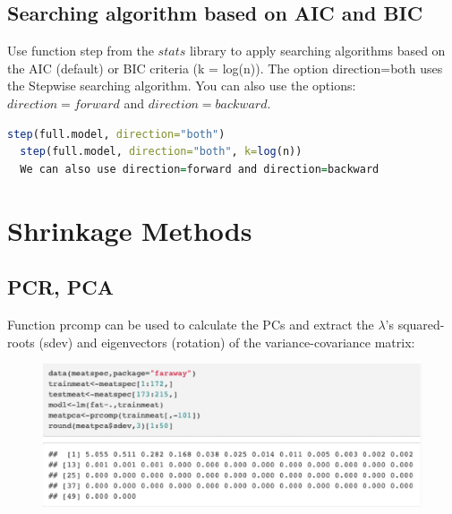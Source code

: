 \documentclass[11pt,a4paper]{article}
\begin{document}
\subsection{Searching algorithm based on AIC and BIC}
Use function step from the $stats$ library to apply searching algorithms based on the AIC (default) or BIC criteria (k = log(n)). The option direction=both uses the Stepwise searching algorithm. You can also use the options: $direction=forward$ and $direction=backward$.
\begin{lstlisting}[language=R]
  step(full.model, direction="both")
  step(full.model, direction="both", k=log(n))
  We can also use direction=forward and direction=backward
\end{lstlisting}



\section{Shrinkage Methods}
\subsection{PCR, PCA}
Function prcomp can be used to calculate the PCs and extract the $\lambda$’s squared-roots (sdev) and eigenvectors (rotation) of the variance-covariance matrix:
\begin{center}\begin{figure}[htbp]
  \centering
  \includegraphics[scale=0.5]{prcomp}
  \caption{}
  \label{}
\end{figure}\end{center}
\end{document}
